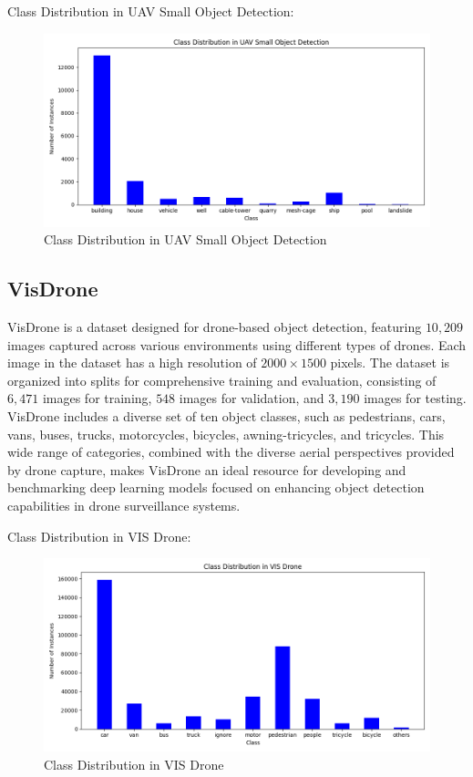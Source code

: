 Class Distribution in UAV Small Object Detection:

\begin{figure}[h!]
    \centering
    \includegraphics[scale=0.55]{Figures/uav_sod_data_class_distribution.png}
    \caption{Class Distribution in UAV Small Object Detection}
    \label{fig:uav-class}
\end{figure}


\subsection{VisDrone}

VisDrone \cite{VisDroneDataset} is a dataset designed for drone-based object detection, featuring $10,209$ images captured across various environments using different 
types of drones. Each image in the dataset has a high resolution of $2000 \times 1500$ pixels. The dataset is organized into splits for comprehensive 
training and evaluation, consisting of $6,471$ images for training, $548$ images for validation, and $3,190$ images for testing. VisDrone includes a 
diverse set of ten object classes, such as pedestrians, cars, vans, buses, trucks, motorcycles, bicycles, awning-tricycles, and tricycles. This wide 
range of categories, combined with the diverse aerial perspectives provided by drone capture, makes VisDrone an ideal resource for developing and 
benchmarking deep learning models focused on enhancing object detection capabilities in drone surveillance systems.

Class Distribution in VIS Drone:

\begin{figure}[h!]
    \centering
    \includegraphics[scale=0.55]{Figures/vis_drone_data_class_distribution.png}
    \caption{Class Distribution in VIS Drone }
    \label{fig:vis-class}
\end{figure}



